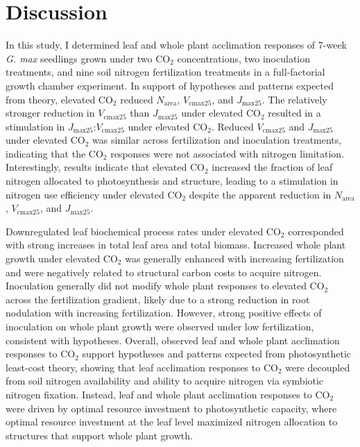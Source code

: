\section{Discussion}
\noindent In this study, I determined leaf and whole plant acclimation responses of 7-week \textit{G. max} seedlings grown under two CO$_2$ concentrations, two inoculation treatments, and nine soil nitrogen fertilization treatments in a full-factorial growth chamber experiment. In support of hypotheses and patterns expected from theory, elevated CO$_2$ reduced $N_\mathrm{area}$, $V_\mathrm{cmax25}$, and $J_\mathrm{max25}$. The relatively stronger reduction in $V_\mathrm{cmax25}$ than $J_\mathrm{max25}$ under elevated CO$_2$ resulted in a stimulation in $J_\mathrm{max25}$:$V_\mathrm{cmax25}$ under elevated CO$_2$. Reduced $V_\mathrm{cmax25}$ and $J_\mathrm{max25}$ under elevated CO$_2$ was similar across fertilization and inoculation treatments, indicating that the CO$_2$ responses were not associated with nitrogen limitation. Interestingly, results indicate that elevated CO$_2$ increased the fraction of leaf nitrogen allocated to photosynthesis and structure, leading to a stimulation in nitrogen use efficiency under elevated CO$_2$ despite the apparent reduction in $N_\mathrm{area}$, $V_\mathrm{cmax25}$, and $J_\mathrm{max25}$.

Downregulated leaf biochemical process rates under elevated CO$_2$ corresponded with strong increases in total leaf area and total biomass. Increased whole plant growth under elevated CO$_2$ was generally enhanced with increasing fertilization and were negatively related to structural carbon costs to acquire nitrogen. Inoculation generally did not modify whole plant responses to elevated CO$_2$ across the fertilization gradient, likely due to a strong reduction in root nodulation with increasing fertilization. However, strong positive effects of inoculation on whole plant growth were observed under low fertilization, consistent with hypotheses. Overall, observed leaf and whole plant acclimation responses to CO$_2$ support hypotheses and patterns expected from photosynthetic least-cost theory, showing that leaf acclimation responses to CO$_2$ were decoupled from soil nitrogen availability and ability to acquire nitrogen via symbiotic nitrogen fixation. Instead, leaf and whole plant acclimation responses to CO$_2$ were driven by optimal resource investment to photosynthetic capacity, where optimal resource investment at the leaf level maximized nitrogen allocation to structures that support whole plant growth.

